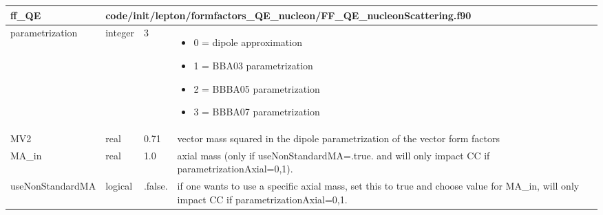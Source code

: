\documentclass{article}
\begin{document}
\begin{longtable}{llll}
\toprule
\textbf{\large{ff\_QE}} & \multicolumn{3}{l}{\footnotesize{code/init/lepton/formfactors\_QE\_nucleon/FF\_QE\_nucleonScattering.f90}}\\*
\midrule
\endfirsthead
\midrule
\endhead
parametrization & \begin{minipage}[t]{2cm}integer\end{minipage} & \begin{minipage}[t]{2cm}3\end{minipage} & \begin{minipage}[t]{12cm}\begin{itemize}\leftmargin0em\itemindent0pt\item 0 = dipole approximation\item 1 = BBA03 parametrization\item 2 = BBBA05 parametrization\item 3 = BBBA07 parametrization\end{itemize}\end{minipage}\\*
\midrule
MV2 & \begin{minipage}[t]{2cm}real\end{minipage} & \begin{minipage}[t]{2cm}0.71\end{minipage} & \begin{minipage}[t]{12cm}vector mass squared in the dipole parametrization of the vector form factors\end{minipage}\\*
\midrule
MA\_in & \begin{minipage}[t]{2cm}real\end{minipage} & \begin{minipage}[t]{2cm}1.0\end{minipage} & \begin{minipage}[t]{12cm}axial mass (only if useNonStandardMA=.true.  and will only impact CC if parametrizationAxial=0,1).\end{minipage}\\*
\midrule
useNonStandardMA & \begin{minipage}[t]{2cm}logical\end{minipage} & \begin{minipage}[t]{2cm}.false.\end{minipage} & \begin{minipage}[t]{12cm}if one wants to use a specific axial mass, set this to true and choose value for MA\_in, will only impact CC if parametrizationAxial=0,1.\end{minipage}\\*

\end{longtable}
\end{document}

